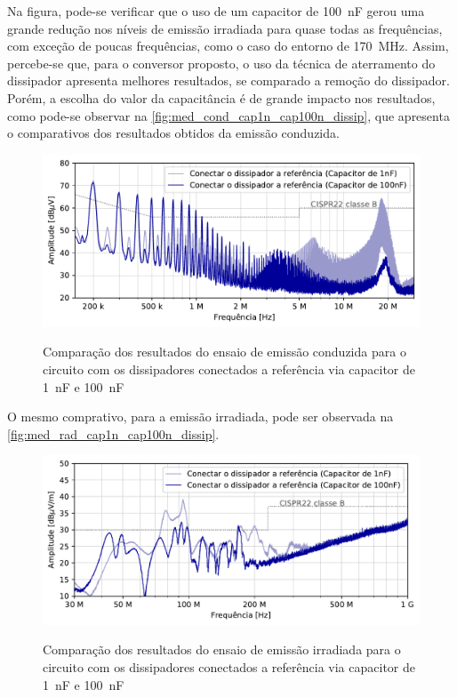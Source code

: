     Na figura, pode-se verificar que o uso de um capacitor de \qty{100}{\nano\farad} gerou uma grande redução nos níveis de emissão irradiada para quase todas as frequências, com exceção de poucas frequências, como o caso do entorno de \qty{170}{\mega\hertz}. Assim, percebe-se que, para o conversor proposto, o uso da técnica de aterramento do dissipador apresenta melhores resultados, se comparado a remoção do dissipador. Porém, a escolha do valor da capacitância é de grande impacto nos resultados, como pode-se observar na \autoref{fig:med_cond_cap1n_cap100n_dissip}, que apresenta o comparativos dos resultados obtidos da emissão conduzida.
    
    \begin{figure}[H]
    	\centering
    	\caption{Comparação dos resultados do ensaio de emissão conduzida para o circuito com os dissipadores conectados a referência via capacitor de \qty{1}{\nano\farad} e \qty{100}{\nano\farad}}
    	\includegraphics[scale=.85]{pdf/cond/cond-Conectar o dissipador a referência (Capacitor de 1nF)-Conectar o dissipador a referência (Capacitor de 100nF).pdf}
    	\label{fig:med_cond_cap1n_cap100n_dissip}
    \end{figure}
    
    O mesmo comprativo, para a emissão irradiada, pode ser observada na \autoref{fig:med_rad_cap1n_cap100n_dissip}.
    
    \begin{figure}[H]
    	\centering
    	\caption{Comparação dos resultados do ensaio de emissão irradiada para o circuito com os dissipadores conectados a referência via capacitor de \qty{1}{\nano\farad} e \qty{100}{\nano\farad}}
    	\includegraphics[scale=.85]{pdf/rad/Conectar o dissipador a referência (Capacitor de 1nF)-Conectar o dissipador a referência (Capacitor de 100nF).pdf}
    	\label{fig:med_rad_cap1n_cap100n_dissip}
    \end{figure}

